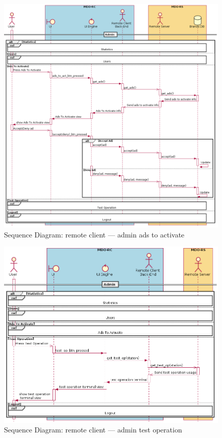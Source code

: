 \begin{figure}[htb!]
\centering
    \includegraphics[width=1\columnwidth]{./img/seq-rc-admin-ads-to-act.png}
  \caption{Sequence Diagram: remote client --- admin ads to activate}%
\label{fig:seq-rc-admin-ads-to-act}
\end{figure}

\begin{figure}[htb!]
\centering
    \includegraphics[width=1\columnwidth]{./img/seq-rc-admin-test-op.png}
  \caption{Sequence Diagram: remote client --- admin test operation}%
\label{fig:seq-rc-admin-test-op}
\end{figure}

